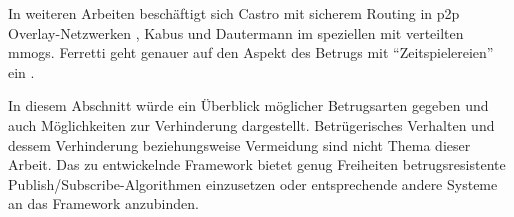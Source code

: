 In weiteren Arbeiten beschäftigt sich Castro mit sicherem Routing in p2p Overlay-Netzwerken \cite{Castro2002Secure}, Kabus \cite{Kabus2005Addressing} und Dautermann \cite{Dautermann2007} im speziellen mit verteilten \acp{mmog}. Ferretti geht genauer auf den Aspekt des Betrugs mit ``Zeitspielereien'' ein \cite{Ferretti2008Cheating}.

In diesem Abschnitt würde ein Überblick möglicher Betrugsarten gegeben und auch Möglichkeiten zur Verhinderung dargestellt. Betrügerisches Verhalten und dessem Verhinderung beziehungsweise Vermeidung sind nicht Thema dieser Arbeit. Das zu entwickelnde Framework bietet genug Freiheiten betrugsresistente Publish/Subscribe-Algorithmen einzusetzen oder entsprechende andere Systeme an das Framework anzubinden.

